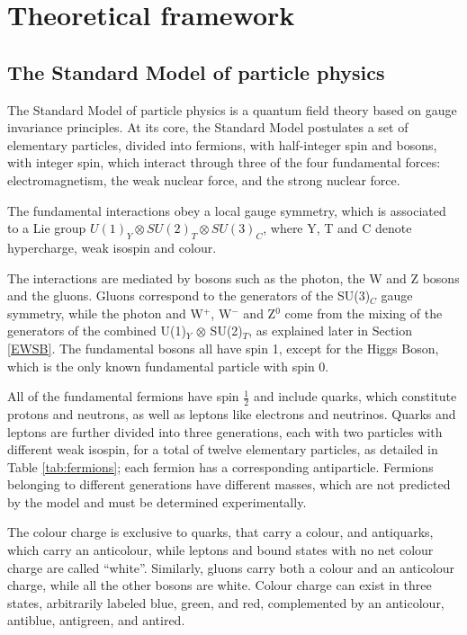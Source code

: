 \chapter{Theoretical framework}
\section{The Standard Model of particle physics}
The Standard Model of particle physics is a quantum field theory based on gauge invariance principles.
At its core, the Standard Model postulates a set of elementary particles, divided into fermions, with half-integer spin and bosons, with integer spin, which interact through three of the four fundamental forces: electromagnetism, the weak nuclear force, and the strong nuclear force.

The fundamental interactions obey a local gauge symmetry, which is associated to a Lie group $U(1)_Y \otimes SU(2)_T \otimes SU(3)_C$, where Y, T and C denote hypercharge, weak isospin and colour.

The interactions are mediated by bosons such as the photon, the W and Z bosons and the gluons.
Gluons correspond to the generators of the SU(3)$_C$ gauge symmetry, while the photon and W$^+$, W$^-$ and Z$^0$ come from the mixing of the generators of the combined U(1)$_Y$ $\otimes$ SU(2)$_T$, as explained later in Section \ref{EWSB}.
The fundamental bosons all have spin 1, except for the Higgs Boson, which is the only known fundamental particle with spin 0.

All of the fundamental fermions have spin $\frac{1}{2}$ and include quarks, which constitute protons and neutrons, as well as leptons like electrons and neutrinos.
Quarks and leptons are further divided into three generations, each with two particles with different weak isospin, for a total of twelve elementary particles, as detailed in Table \ref{tab:fermions}; each fermion has a corresponding antiparticle.
Fermions belonging to different generations have different masses, which are not predicted by the model and must be determined experimentally.

The colour charge is exclusive to quarks, that carry a colour, and antiquarks, which carry an anticolour, while leptons and bound states with no net colour charge are called ``white''.
Similarly, gluons carry both a colour and an anticolour charge, while all the other bosons are white.
Colour charge can exist in three states, arbitrarily labeled blue, green, and red, complemented by an anticolour, antiblue, antigreen, and antired.

